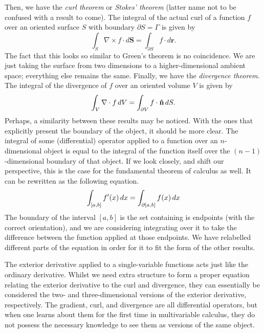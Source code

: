 \documentclass[a4paper,12pt]{article}
\begin{document}
Then, we have the \emph{curl theorem} or \emph{Stokes' theorem} (latter name not to be confused with a result to come).
The integral of the actual curl of a function $f$ over an oriented surface $S$ with boundary $\partial S = \Gamma$ is given by
\begin{equation*}
    \int_S \nabla \times f \cdot d\mathbf{S} = \int_{\partial S} f \cdot d\mathbf{r}.
\end{equation*}
The fact that this looks so similar to Green's theorem is no coincidence.
We are just taking the surface from two dimensions to a higher-dimensional ambient space; everything else remains the same.
Finally, we have the \emph{divergence theorem}.
The integral of the divergence of $f$ over an oriented volume $V$ is given by
\begin{equation*}
    \int_V \nabla \cdot f \mathop{}\!d V = \int_{\partial V} f \cdot \mathbf{\hat{n}} \mathop{}\!d S.
\end{equation*}
Perhaps, a similarity between these results may be noticed.
With the ones that explicitly present the boundary of the object, it should be more clear.
The integral of some (differential) operator applied to a function over an $n$-dimensional object is equal to the integral of the function itself over the $(n-1)$-dimensional boundary of that object.
If we look closely, and shift our perspective, this is the case for the fundamental theorem of calculus as well.
It can be rewritten as the following equation.
\begin{equation*}
    \int_{[a,b]} f'(x) \mathop{}\!d x = \int_{\partial [a,b]} f(x) \mathop{}\!d x
\end{equation*}
The boundary of the interval $[a, b]$ is the set containing is endpoints (with the correct orientation), and we are considering integrating over it to take the difference between the function applied at those endpoints.
We have relabelled different parts of the equation in order for it to fit the form of the other results.

The exterior derivative applied to a single-variable functions acts just like the ordinary derivative.
Whilst we need extra structure to form a proper equation relating the exterior derivative to the curl and divergence, they can essentially be considered the two- and three-dimensional versions of the exterior derivative, respectively.
The gradient, curl, and divergence are all differential operators, but when one learns about them for the first time in multivariable calculus, they do not possess the necessary knowledge to see them as versions of the same object.
\end{document}
